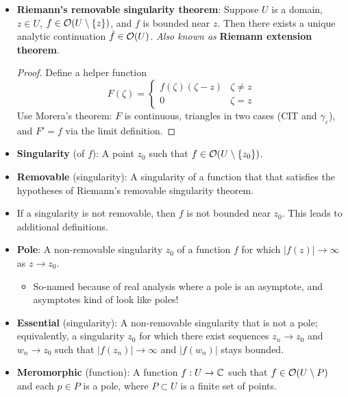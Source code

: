 \documentclass[../notes.tex]{subfiles}
\begin{document}
\begin{itemize}
    \begin{proof}
        The primitive exists. The primitive is holomorphic. Therefore, $F'=f$ is holomorphic.
    \end{proof}
    \item \textbf{Riemann's removable singularity theorem}: Suppose $U$ is a domain, $z\in U$, $f\in\mathcal{O}(U\setminus\{z\})$, and $f$ is bounded near $z$. Then there exists a unique analytic continuation $\hat{f}\in\mathcal{O}(U)$. \emph{Also known as} \textbf{Riemann extension theorem}.
    \begin{proof}
        Define a helper function
        \begin{equation*}
            F(\zeta) =
            \begin{cases}
                f(\zeta)(\zeta-z) & \zeta\neq z\\
                0 & \zeta=z
            \end{cases}
        \end{equation*}
        Use Morera's theorem: $F$ is continuous, triangles in two cases (CIT and $\gamma_\varepsilon$), and $F'=f$ via the limit definition.
    \end{proof}
    \item \textbf{Singularity} (of $f$): A point $z_0$ such that $f\in\mathcal{O}(U\setminus\{z_0\})$.
    \item \textbf{Removable} (singularity): A singularity of a function that that satisfies the hypotheses of Riemann's removable singularity theorem.
    \item If a singularity is not removable, then $f$ is not bounded near $z_0$. This leads to additional definitions.
    \item \textbf{Pole}: A non-removable singularity $z_0$ of a function $f$ for which $|f(z)|\to\infty$ as $z\to z_0$.
    \begin{itemize}
        \item So-named because of real analysis where a pole is an asymptote, and asymptotes kind of look like poles!
    \end{itemize}
    \item \textbf{Essential} (singularity): A non-removable singularity that is not a pole; equivalently, a singularity $z_0$ for which there exist sequences $z_n\to z_0$ and $w_n\to z_0$ such that $|f(z_n)|\to\infty$ and $|f(w_n)|$ stays bounded.
    \item \textbf{Meromorphic} (function): A function $f:U\to\mathbb{C}$ such that $f\in\mathcal{O}(U\setminus P)$ and each $p\in P$ is a pole, where $P\subset U$ is a finite set of points.

\end{itemize}
\end{document}
